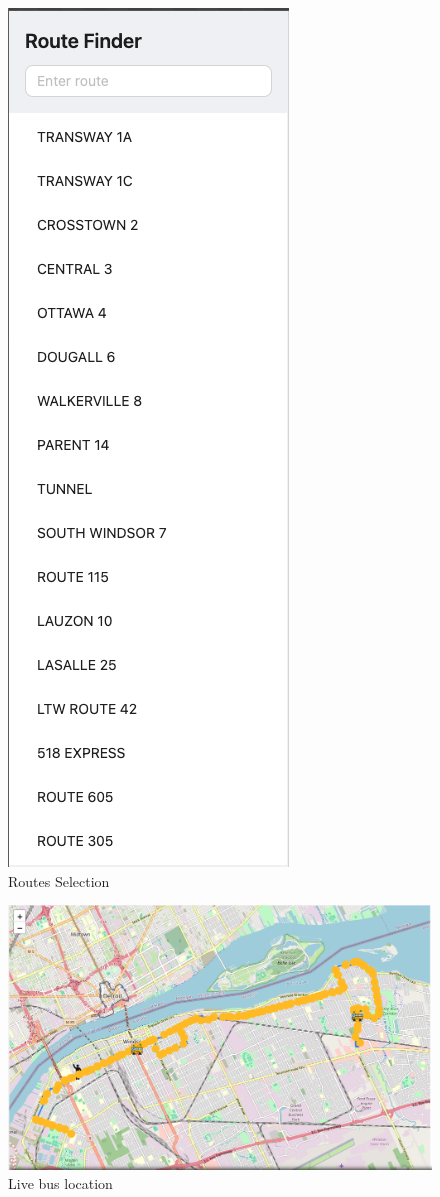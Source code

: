 \documentclass[conference]{IEEEtran}
\begin{document}
\begin{figure}
    \centering
    \includegraphics[width=0.5\linewidth]{fe_routes.png}
    \caption{Routes Selection}
    \label{fig:enter-label}
\end{figure}


\begin{figure}
    \centering
    \includegraphics[width=1\linewidth]{fe_map.png}
    \caption{Live bus location}
    \label{fig:enter-label}
\end{figure}
\end{document}

